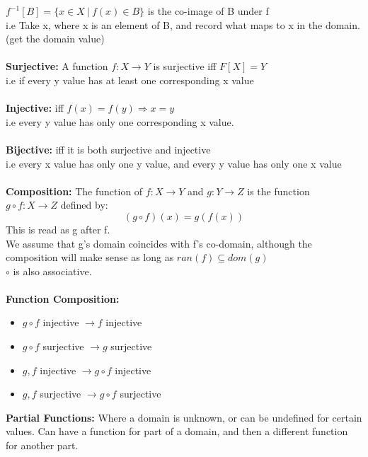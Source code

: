 \documentclass[a4paper,10pt]{article}
\begin{document}
$f^{-1}[B] = \{x \in X \ | \ f(x) \in B\}$ is the \textcolor{BlueGreen}{co-image} of B under f \\
i.e Take x, where x is an element of B, and record what maps to x in the domain. (get the domain value) \\\\
\textcolor{BlueGreen}{\textbf{Surjective:}} A function $f: X \rightarrow Y$ is surjective iff $F[X] = Y$\\
i.e if every y value has at least one corresponding x value \\\\
\textcolor{BlueGreen}{\textbf{Injective:}} iff $f(x) = f(y) \Rightarrow x = y$  \\
i.e every y value has only one corresponding x value. \\\\
\textcolor{BlueGreen}{\textbf{Bijective:}} iff it is both surjective and injective \\
i.e every x value has only one y value, and every y value has only one x value \\\\
\textcolor{BlueGreen}{\textbf{Composition:}} The function of $f: X \rightarrow Y$ and $g: Y \rightarrow Z$ is the function $g \circ f: X \rightarrow Z$ defined by: \\
\begin{equation*}
(g \circ f) (x) = g(f(x))
\end{equation*}
\newline 
This is read as g after f. \\
We assume that g's domain coincides with f's co-domain, although the composition will make sense as long as $ran(f) \subseteq dom(g)$ \\
$\circ$ is also associative. \\\\
\textcolor{BlueGreen}{\textbf{Function Composition:}} 
\renewcommand{\labelitemi}{\textperiodcentered}
\begin{itemize}
\item $g \circ f$ injective $\rightarrow f$ injective
\item $g \circ f$ surjective $\rightarrow g$ surjective
\item $g, f$ injective $\rightarrow g \circ f$ injective
\item $g, f$ surjective $\rightarrow 	g \circ f$ surjective\\
\end{itemize}
\textcolor{BlueGreen}{\textbf{Partial Functions:}} Where a domain is unknown, or can be undefined for certain values. Can have a function for part of a domain, and then a different function for another part. \\\\
\newpage
\end{document}
